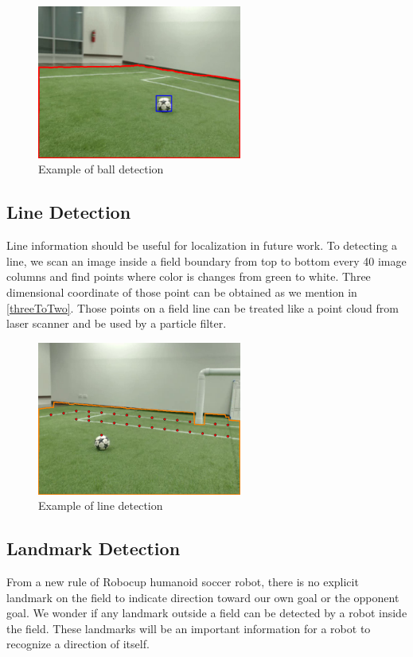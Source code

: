 	\begin{figure}[H]
		\centering
		\includegraphics[width=0.6\textwidth]{image/ballDetection.png}
		\caption{Example of ball detection}
		\label{ball}
	\end{figure}
	
	\subsection{Line Detection}
	Line information should be useful for localization in future work. To detecting a line, we scan an image inside a field boundary from top to bottom every 40 image columns and find points where color is changes from green to white. Three dimensional coordinate of those point can be obtained as we mention in \ref{threeToTwo}. Those points on a field line can be treated like a point cloud from laser scanner and be used by a particle filter.
	\begin{figure}[H]
		\centering
		\includegraphics[width=0.6\textwidth]{image/lineDetection.png}
		\caption{Example of line detection}
		\label{lineDetection}
	\end{figure}
	\subsection{Landmark Detection}
	From a new rule of Robocup humanoid soccer robot, there is no explicit landmark on the field to indicate direction toward our own goal or the opponent goal. We wonder if any landmark outside a field can be detected by a robot inside the field. These landmarks will be an important information for a robot to recognize a direction of itself.
